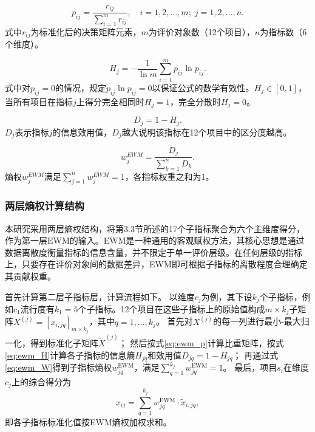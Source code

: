 \documentclass[twoside]{CUGThesis}
\begin{document}
\begin{equation}
p_{ij} = \frac{r_{ij}}{\sum_{i=1}^{m} r_{ij}}, \quad i = 1,2,\dots,m;\; j = 1,2,\dots,n .
\label{eq:ewm_p}
\end{equation}
式中$r_{ij}$为标准化后的决策矩阵元素，$m$为评价对象数（12个项目），$n$为指标数（6个维度）。

\begin{equation}
H_j = -\frac{1}{\ln m} \sum_{i=1}^{m} p_{ij} \ln p_{ij} .
\label{eq:ewm_H}
\end{equation}
式中对$p_{ij} = 0$的情况，规定$p_{ij} \ln p_{ij} = 0$以保证公式的数学有效性\cite{Shannon1948}。$H_j \in [0, 1]$，当所有项目在指标$j$上得分完全相同时$H_j = 1$，完全分散时$H_j = 0$。

\begin{equation}
D_j = 1 - H_j .
\label{eq:ewm_D}
\end{equation}
$D_j$表示指标$j$的信息效用值，$D_j$越大说明该指标在12个项目中的区分度越高。

\begin{equation}
w_j^{EWM} = \frac{D_j}{\sum\limits_{k=1}^{n} D_k} .
\label{eq:ewm_W}
\end{equation}
熵权$w_j^{EWM}$满足$\sum_{j=1}^{n} w_j^{EWM} = 1$，各指标权重之和为1。

\subsubsection{两层熵权计算结构}

本研究采用两层熵权结构，将第3.3节所述的17个子指标聚合为六个主维度得分，作为第一层EWM的输入。EWM是一种通用的客观赋权方法，其核心思想是通过数据离散度衡量指标的信息含量，并不限定于单一评价层级\cite{Hwang1981}。在任何层级的指标上，只要存在评价对象间的数据差异，EWM即可根据子指标的离散程度合理确定其贡献权重。

首先计算第二层子指标层，计算流程如下。
以维度$c_j$为例，其下设$k_j$个子指标，例如$c_1$流行度有$k_1=5$个子指标。12个项目在这些子指标上的原始值构成$m \times k_j$子矩阵$X^{(j)} = [x_{i,jq}]_{m \times k_j}$，其中$q=1,\dots,k_j$。
首先对$X^{(j)}$的每一列进行最小-最大归一化，得到标准化子矩阵$\tilde{X}^{(j)}$；
然后按式\eqref{eq:ewm_p}计算比重矩阵，按式\eqref{eq:ewm_H}计算各子指标的信息熵$H_{jq}$和效用值$D_{jq} = 1 - H_{jq}$；
再通过式\eqref{eq:ewm_W}得到子指标熵权$w_{jq}^{\text{EWM}}$，满足$\sum_{q=1}^{k_j} w_{jq}^{\text{EWM}} = 1$。
最后，项目$s_i$在维度$c_j$上的综合得分为
\begin{equation}
x_{ij} = \sum_{q=1}^{k_j} w_{jq}^{\text{EWM}} \cdot \tilde{x}_{i,jq} ,
\label{eq:subscore}
\end{equation}
即各子指标标准化值按EWM熵权加权求和。
\end{document}
